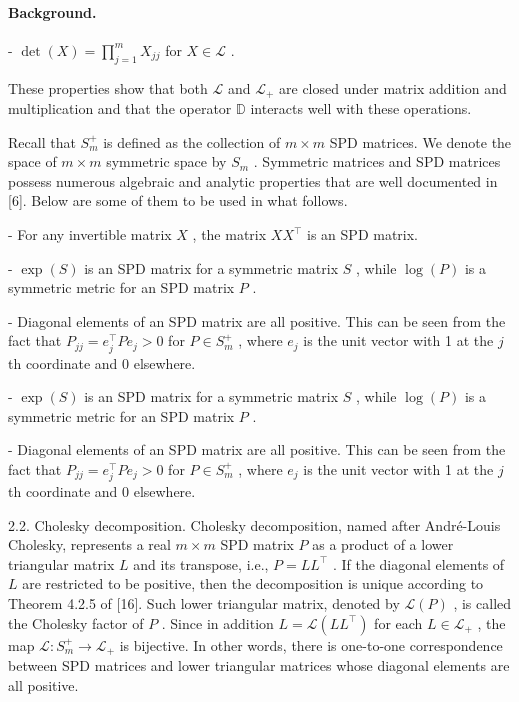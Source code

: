 \documentclass[11pt]{article}
\begin{document}
\paragraph{Background.}
-  $\operatorname{det}(X) = \prod_{j=1}^{m} X_{jj}$  for  $X \in \mathcal{L}$ .

These properties show that both  $\mathcal{L}$  and  $\mathcal{L}_{+}$  are closed under matrix addition and multiplication and that the operator  $\mathbb{D}$  interacts well with these operations.

Recall that  $S_{m}^{+}$  is defined as the collection of  $m \times m$  SPD matrices. We denote the space of  $m \times m$  symmetric space by  $S_{m}$ . Symmetric matrices and SPD matrices possess numerous algebraic and analytic properties that are well documented in [6]. Below are some of them to be used in what follows.

- For any invertible matrix  $X$ , the matrix  $XX^{\top}$  is an SPD matrix.

-  $\exp(S)$  is an SPD matrix for a symmetric matrix  $S$ , while  $\log(P)$  is a symmetric metric for an SPD matrix  $P$ .

- Diagonal elements of an SPD matrix are all positive. This can be seen from the fact that  $P_{jj} = e_j^\top Pe_j > 0$  for  $P \in S_m^+$ , where  $e_j$  is the unit vector with 1 at the  $j$ th coordinate and 0 elsewhere.

-  $\exp(S)$  is an SPD matrix for a symmetric matrix  $S$ , while  $\log(P)$  is a symmetric metric for an SPD matrix  $P$ .

- Diagonal elements of an SPD matrix are all positive. This can be seen from the fact that  $P_{jj} = e_j^\top Pe_j > 0$  for  $P \in S_m^+$ , where  $e_j$  is the unit vector with 1 at the  $j$ th coordinate and 0 elsewhere.

2.2. Cholesky decomposition. Cholesky decomposition, named after André-Louis Cholesky, represents a real  $m \times m$  SPD matrix  $P$  as a product of a lower triangular matrix  $L$  and its transpose, i.e.,  $P = LL^{\top}$ . If the diagonal elements of  $L$  are restricted to be positive, then the decomposition is unique according to Theorem 4.2.5 of [16]. Such lower triangular matrix, denoted by  $\mathcal{L}(P)$ , is called the Cholesky factor of  $P$ . Since in addition  $L = \mathcal{L}(LL^{\top})$  for each  $L \in \mathcal{L}_{+}$ , the map  $\mathcal{L}: S_{m}^{+} \to \mathcal{L}_{+}$  is bijective. In other words, there is one-to-one correspondence between SPD matrices and lower triangular matrices whose diagonal elements are all positive.
\end{document}
